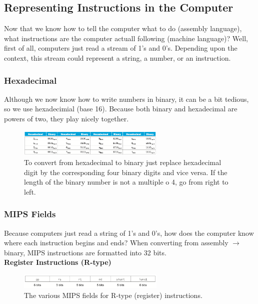 \documentclass[10pt]{article}
\begin{document}
\subsection{Representing Instructions in the Computer}\label{subsec:}
Now that we know how to tell the computer what to do (assembly language), what instructions are the computer actuall following (machine language)?
Well, first of all, computers just read a stream of 1's and 0's.  Depending upon the context, this stream could represent a string, a number, or an instruction.
\subsubsection{Hexadecimal}
Although we now know how to write numbers in binary, it can be a bit tedious, so we use hexadecimial (base 16).  Because both binary and hexadecimal are powers of two, they play nicely together.
\begin{figure}[H]
  \centering
  \includegraphics[width=7cm]{8.png}
  \caption{To convert from hexadecimal to binary just replace hexadecimal digit by the corresponding four binary digits and vice versa. If the length of the binary number is not a multiple o 4, go from right to left.}
  \label{fig:}
\end{figure}
\subsubsection{MIPS Fields}
Because computers just read a string of 1's and 0's, how does the computer know where each instruction begins and ends?
When converting from assembly $\longrightarrow$ binary, MIPS instructions are formatted into 32 bits.\\
\textbf{Register Instructions (R-type)}
\begin{figure}[H]
  \centering
 \includegraphics[width=7cm]{9.png}
\caption{The various MIPS fields for R-type (register) instructions.}
  \label{fig:}
\end{figure}
\end{document}
